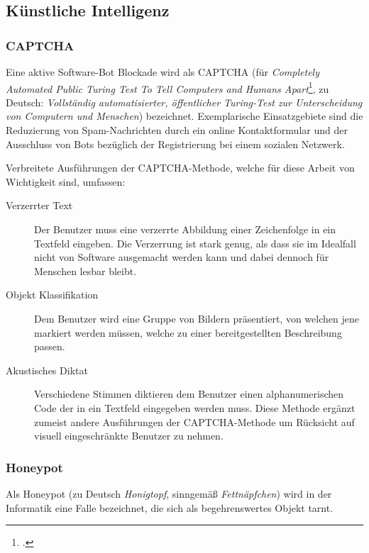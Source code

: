 \subsection{Künstliche Intelligenz} %
\label{sub:kunstliche_intelligenz}
\subsubsection{CAPTCHA} %
\label{ssub:captcha}
Eine aktive Software-Bot Blockade wird als CAPTCHA (für \emph{Completely
Automated Public Turing Test To Tell Computers and Humans
Apart}\footcite{captchaNet}, zu Deutsch: \emph{Vollständig
automatisierter, öffentlicher Turing-Test zur Unterscheidung von
Computern und Menschen}) bezeichnet. Exemplarische Einsatzgebiete sind
die Reduzierung von Spam-Nachrichten durch ein online Kontaktformular
und der Ausschluss von Bots bezüglich der Registrierung bei einem
sozialen Netzwerk.

Verbreitete Ausführungen der CAPTCHA-Methode, welche für diese Arbeit
von Wichtigkeit sind, umfassen:

\begin{description}
  \item[Verzerrter Text]
  Der Benutzer muss eine verzerrte Abbildung einer Zeichenfolge in ein
  Textfeld eingeben. Die Verzerrung ist stark genug, als dass sie im
  Idealfall nicht von Software ausgemacht werden kann und dabei dennoch
  für Menschen lesbar bleibt.
  
  \item[Objekt Klassifikation]
  Dem Benutzer wird eine Gruppe von Bildern präsentiert, von welchen jene
  markiert werden müssen, welche zu einer bereitgestellten Beschreibung
  passen.
  
  \item[Akustisches Diktat]
  Verschiedene Stimmen diktieren dem Benutzer einen alphanumerischen Code
  der in ein Textfeld eingegeben werden muss. Diese Methode ergänzt zumeist
  andere Ausführungen der CAPTCHA-Methode um Rücksicht auf visuell
eingeschränkte Benutzer zu nehmen.
\end{description}

\subsubsection{Honeypot} %
\label{ssub:honeypot}
Als Honeypot (zu Deutsch \emph{Honigtopf}, sinngemäß \emph{Fettnäpfchen}) wird in der Informatik eine Falle bezeichnet, die sich als begehrenswertes Objekt tarnt.


